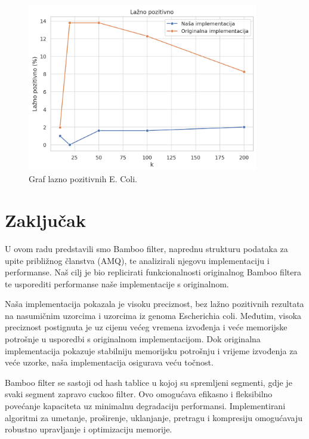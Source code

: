 \documentclass[seminarskirad]{fer}
\begin{document}
\begin{figure}[h]
	\centering
	\includegraphics[width=0.9\textwidth]{images/EColi_rezultati_lazno.png}
	\caption{Graf lazno pozitivnih E. Coli.}
	\label{fig:EColi_rezultati_lazno}
\end{figure}


\chapter{Zaključak}
\label{pog:zakljucak}
U ovom radu predstavili smo Bamboo filter, naprednu strukturu podataka za upite približnog članstva (AMQ), te analizirali njegovu implementaciju i performanse. Naš cilj je bio replicirati funkcionalnosti originalnog Bamboo filtera te usporediti performanse naše implementacije s originalnom.

Naša implementacija pokazala je visoku preciznost, bez lažno pozitivnih rezultata na nasumičnim uzorcima i uzorcima iz genoma Escherichia coli. Međutim, visoka preciznost postignuta je uz cijenu većeg vremena izvođenja i veće memorijske potrošnje u usporedbi s originalnom implementacijom. Dok originalna implementacija pokazuje stabilniju memorijsku potrošnju i vrijeme izvođenja za veće uzorke, naša implementacija osigurava veću točnost.

Bamboo filter se sastoji od hash tablice u kojoj su spremljeni segmenti, gdje je svaki segment zapravo cuckoo filter. Ovo omogućava efikasno i fleksibilno povećanje kapaciteta uz minimalnu degradaciju performansi. Implementirani algoritmi za umetanje, proširenje, uklanjanje, pretragu i kompresiju omogućavaju robustno upravljanje i optimizaciju memorije.
\end{document}
